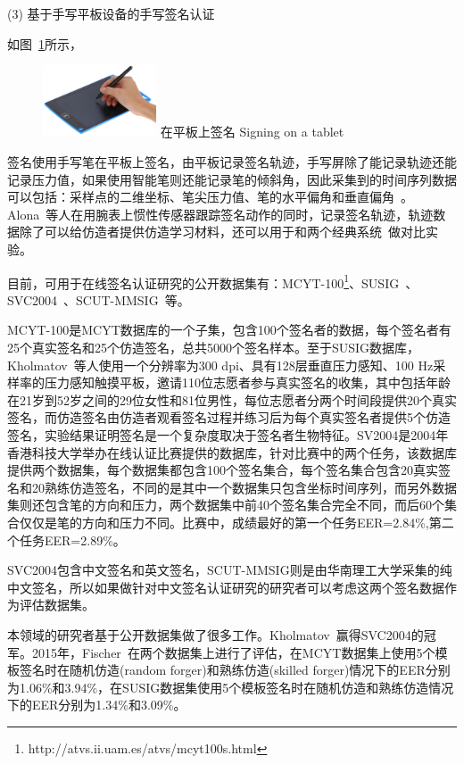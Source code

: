 (3) 基于手写平板设备的手写签名认证


如图~\ref{fig:signing-tablet}所示，
\begin{figure}[!htp]
  \centering
  \includegraphics[width=0.3\textwidth]{figure/tablet.png}
  \bicaption
    {在平板上签名}
    {Signing on a tablet}
  \label{fig:signing-tablet}
\end{figure}
签名使用手写笔在平板上签名，由平板记录签名轨迹，手写屏除了能记录轨迹还能记录压力值，如果使用智能笔则还能记录笔的倾斜角，因此采集到的时间序列数据可以包括：采样点的二维坐标、笔尖压力值、笔的水平偏角和垂直偏角~\cite{房育勋在线签名认证若干关键问题研究}。Alona~\cite{Levy2018Handwritten}等人在用腕表上惯性传感器跟踪签名动作的同时，记录签名轨迹，轨迹数据除了可以给仿造者提供仿造学习材料，还可以用于和两个经典系统~\cite{fischer2015robust,kholmatov2005identity}做对比实验。

目前，可用于在线签名认证研究的公开数据集有：MCYT-100\footnote{http://atvs.ii.uam.es/atvs/mcyt100s.html}、SUSIG~\cite{kholmatov2006sigsa}、SVC2004~\cite{10.1007/978-3-540-25948-0_3}、SCUT-MMSIG~\cite{10.1007/978-3-319-69923-3_78}等。

MCYT-100是MCYT数据库的一个子集，包含100个签名者的数据，每个签名者有25个真实签名和25个仿造签名，总共5000个签名样本。至于SUSIG数据库，Kholmatov~\cite{kholmatov2006sigsa}等人使用一个分辨率为300 dpi、具有128层垂直压力感知、100 Hz采样率的压力感知触摸平板，邀请110位志愿者参与真实签名的收集，其中包括年龄在21岁到52岁之间的29位女性和81位男性，每位志愿者分两个时间段提供20个真实签名，而仿造签名由仿造者观看签名过程并练习后为每个真实签名者提供5个仿造签名，实验结果证明签名是一个复杂度取决于签名者生物特征。SV2004是2004年香港科技大学举办在线认证比赛提供的数据库，针对比赛中的两个任务，该数据库提供两个数据集，每个数据集都包含100个签名集合，每个签名集合包含20真实签名和20熟练仿造签名，不同的是其中一个数据集只包含坐标时间序列，而另外数据集则还包含笔的方向和压力，两个数据集中前40个签名集合完全不同，而后60个集合仅仅是笔的方向和压力不同。比赛中，成绩最好的第一个任务EER=2.84\%,第二个任务EER=2.89\%。

SVC2004包含中文签名和英文签名，SCUT-MMSIG则是由华南理工大学采集的纯中文签名，所以如果做针对中文签名认证研究的研究者可以考虑这两个签名数据作为评估数据集。

本领域的研究者基于公开数据集做了很多工作。Kholmatov~\cite{kholmatov2005identity}赢得SVC2004的冠军。2015年，Fischer~\cite{fischer2015robust}在两个数据集上进行了评估，在MCYT数据集上使用5个模板签名时在随机仿造(random forger)和熟练仿造(skilled forger)情况下的EER分别为1.06\%和3.94\%，在SUSIG数据集使用5个模板签名时在随机仿造和熟练仿造情况下的EER分别为1.34\%和3.09\%。


